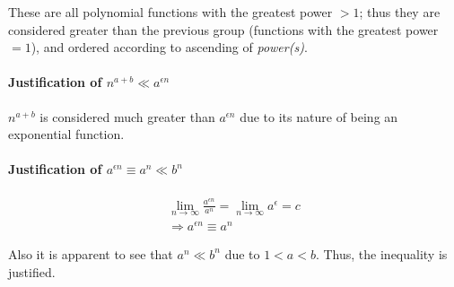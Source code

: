 \documentclass[12pt]{article}
\begin{document}
These are all polynomial functions with the greatest power $> 1$; thus they are considered greater than the previous group (functions with the greatest power $= 1$), and ordered according to ascending of \textit{power(s)}.



\paragraph{Justification of $n^{a+b} \ll a^{\epsilon n} $\newline}

$n^{a+b}$ is considered much greater than $a^{\epsilon n}$ due to its nature of being an exponential function.

\paragraph{Justification of $a^{\epsilon n} \equiv a^n \ll b^n$\newline}


\begin{gather}
    \lim\limits_{n \to \infty} \frac{a^{\epsilon n}}{a^n} = \lim\limits_{n \to \infty} a^{\epsilon} = c \nonumber \\
    \Rightarrow a^{\epsilon n} \equiv a^n
\end{gather}

Also it is apparent to see that $a^n \ll b^n$ due to $1 < a < b$. Thus, the inequality is justified.

%
% 
% 
\end{document}
